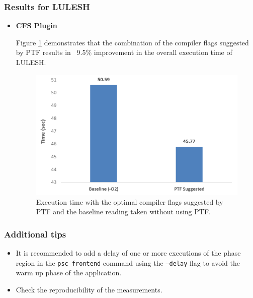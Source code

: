 \subsubsection{Results for LULESH}
	\begin{itemize}
	\item \textbf{CFS Plugin}

Figure \ref{fig:uc3_cfs_results_exec_time} demonstrates that the combination of the compiler flags suggested by PTF results in ~9.5\% improvement in the overall execution time of LULESH.
	
	\begin{figure}[H]
	\centering
	\includegraphics[scale=.60]{../BPG/images/uc3_cfs_results_exec_time.png}
	\caption{Execution time with the optimal compiler flags suggested by PTF and the baseline reading taken without using PTF.}
	\label{fig:uc3_cfs_results_exec_time}
\end{figure}
	\end{itemize}

\subsubsection{Additional tips}
\begin{itemize}

\item It is recommended to add a delay of one or more executions of the phase region in the {\tt psc\_frontend} command using the {\tt --delay} flag to avoid the warm up phase of the application.

\item Check the reproducibility of the measurements.

\end{itemize}
